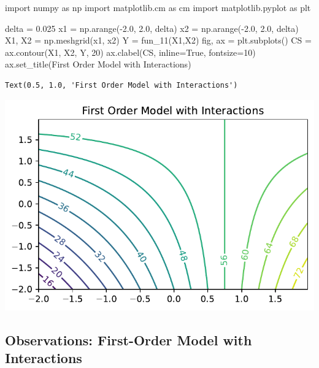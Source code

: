 \documentclass[
  letterpaper,
  DIV=11,
  numbers=noendperiod]{scrreprt}
\newenvironment{Shaded}{\begin{snugshade}}{\end{snugshade}}
\newcommand{\DecValTok}[1]{\textcolor[rgb]{0.68,0.00,0.00}{#1}}
\newcommand{\FloatTok}[1]{\textcolor[rgb]{0.68,0.00,0.00}{#1}}
\newcommand{\ImportTok}[1]{\textcolor[rgb]{0.00,0.46,0.62}{#1}}
\newcommand{\NormalTok}[1]{\textcolor[rgb]{0.00,0.23,0.31}{#1}}
\newcommand{\OperatorTok}[1]{\textcolor[rgb]{0.37,0.37,0.37}{#1}}
\newcommand{\StringTok}[1]{\textcolor[rgb]{0.13,0.47,0.30}{#1}}
\newcommand{\VariableTok}[1]{\textcolor[rgb]{0.07,0.07,0.07}{#1}}
\begin{document}
\begin{Shaded}
\begin{Highlighting}[]
\ImportTok{import}\NormalTok{ numpy }\ImportTok{as}\NormalTok{ np}
\ImportTok{import}\NormalTok{ matplotlib.cm }\ImportTok{as}\NormalTok{ cm}
\ImportTok{import}\NormalTok{ matplotlib.pyplot }\ImportTok{as}\NormalTok{ plt}

\NormalTok{delta }\OperatorTok{=} \FloatTok{0.025}
\NormalTok{x1 }\OperatorTok{=}\NormalTok{ np.arange(}\OperatorTok{{-}}\FloatTok{2.0}\NormalTok{, }\FloatTok{2.0}\NormalTok{, delta)}
\NormalTok{x2 }\OperatorTok{=}\NormalTok{ np.arange(}\OperatorTok{{-}}\FloatTok{2.0}\NormalTok{, }\FloatTok{2.0}\NormalTok{, delta)}
\NormalTok{X1, X2 }\OperatorTok{=}\NormalTok{ np.meshgrid(x1, x2)}
\NormalTok{Y }\OperatorTok{=}\NormalTok{ fun\_11(X1,X2)}
\NormalTok{fig, ax }\OperatorTok{=}\NormalTok{ plt.subplots()}
\NormalTok{CS }\OperatorTok{=}\NormalTok{ ax.contour(X1, X2, Y, }\DecValTok{20}\NormalTok{)}
\NormalTok{ax.clabel(CS, inline}\OperatorTok{=}\VariableTok{True}\NormalTok{, fontsize}\OperatorTok{=}\DecValTok{10}\NormalTok{)}
\NormalTok{ax.set\_title(}\StringTok{\textquotesingle{}First Order Model with Interactions\textquotesingle{}}\NormalTok{)}
\end{Highlighting}
\end{Shaded}

\begin{verbatim}
Text(0.5, 1.0, 'First Order Model with Interactions')
\end{verbatim}

\includegraphics{005_num_rsm_files/figure-pdf/cell-7-output-2.pdf}

\subsection{Observations: First-Order Model with
Interactions}\label{observations-first-order-model-with-interactions}
\end{document}
